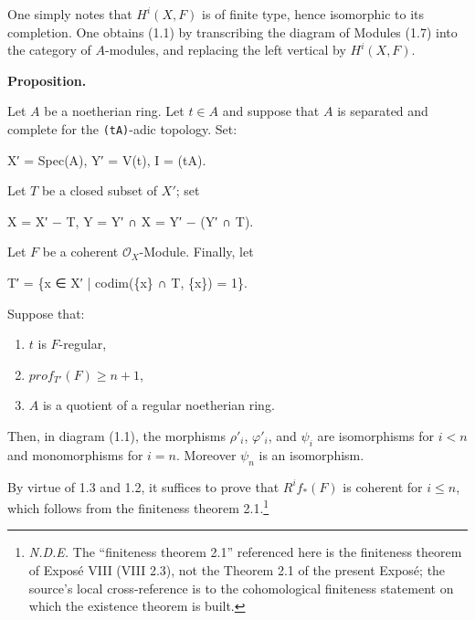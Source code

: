 \documentclass[
]{article}
\newenvironment{Shaded}{}{}
\newcommand{\NormalTok}[1]{#1}
\begin{document}
One simply notes that \(H^{i}(X, F)\) is of finite type, hence
isomorphic to its completion. One obtains (1.1) by transcribing the
diagram of Modules (1.7) into the category of \(A\)-modules, and
replacing the left vertical by \(H^{i}(X, F)\).

\textbf{Proposition.}

Let \(A\) be a noetherian ring. Let \(t \in A\) and suppose that \(A\)
is separated and complete for the \texttt{(tA)}-adic topology. Set:

\begin{Shaded}
\begin{Highlighting}[]
\NormalTok{X′ = Spec(A),    Y′ = V(t),    I = (tA).}
\end{Highlighting}
\end{Shaded}

Let \(T\) be a closed subset of \(X'\); set

\begin{Shaded}
\begin{Highlighting}[]
\NormalTok{X = X′ − T,    Y = Y′ ∩ X = Y′ − (Y′ ∩ T).}
\end{Highlighting}
\end{Shaded}

Let \(F\) be a coherent \(\mathcal{O}_{X}\)-Module. Finally, let

\begin{Shaded}
\begin{Highlighting}[]
\NormalTok{T′ = \{x ∈ X′ | codim(\{x\} ∩ T, \{x\}) = 1\}.}
\end{Highlighting}
\end{Shaded}

Suppose that:

\begin{enumerate}
\def\labelenumi{\alph{enumi})}
\item
  \(t\) is \(F\)-regular,
\item
  \(prof_{T'}(F) \geqslant n + 1\),
\item
  \(A\) is a quotient of a regular noetherian ring.
\end{enumerate}

Then, in diagram (1.1), the morphisms \(\rho'_{i}\), \(\varphi'_{i}\),
and \(\psi_{i}\) are isomorphisms for \(i < n\) and monomorphisms for
\(i = n\). Moreover \(\psi_{n}\) is an isomorphism.

By virtue of 1.3 and 1.2, it suffices to prove that \(R^{i} f_{*}(F)\)
is coherent for \(i \leqslant n\), which follows from the finiteness
theorem 2.1.\footnote{\emph{N.D.E.} The ``finiteness theorem 2.1''
  referenced here is the finiteness theorem of Exposé VIII (VIII 2.3),
  not the Theorem 2.1 of the present Exposé; the source's local
  cross-reference is to the cohomological finiteness statement on which
  the existence theorem is built.}
\end{document}
